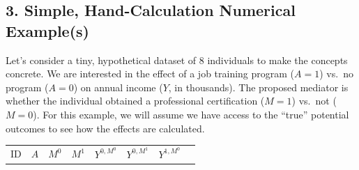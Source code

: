 \documentclass[
  10pt,
  letterpaper,
  DIV=11,
  numbers=noendperiod,
  oneside]{scrartcl}
\begin{document}
\subsection{3. Simple, Hand-Calculation Numerical
Example(s)}\label{simple-hand-calculation-numerical-examples}

Let's consider a tiny, hypothetical dataset of 8 individuals to make the
concepts concrete. We are interested in the effect of a job training
program (\(A=1\)) vs.~no program (\(A=0\)) on annual income (\(Y\), in
thousands). The proposed mediator is whether the individual obtained a
professional certification (\(M=1\)) vs.~not (\(M=0\)). For this
example, we will assume we have access to the ``true'' potential
outcomes to see how the effects are calculated.

\begin{longtable}[]{@{}
  >{\centering\arraybackslash}p{}
  >{\centering\arraybackslash}p{}
  >{\centering\arraybackslash}p{}
  >{\centering\arraybackslash}p{}
  >{\centering\arraybackslash}p{}
  >{\centering\arraybackslash}p{}
  >{\centering\arraybackslash}p{}
  >{\centering\arraybackslash}p{}@{}}
\toprule\noalign{}
\begin{minipage}[b]{\linewidth}\centering
ID
\end{minipage} & \begin{minipage}[b]{\linewidth}\centering
\(A\)
\end{minipage} & \begin{minipage}[b]{\linewidth}\centering
\(M^0\)
\end{minipage} & \begin{minipage}[b]{\linewidth}\centering
\(M^1\)
\end{minipage} & \begin{minipage}[b]{\linewidth}\centering
\(Y^{0, M^0}\)
\end{minipage} & \begin{minipage}[b]{\linewidth}\centering
\(Y^{0, M^1}\)
\end{minipage} & \begin{minipage}[b]{\linewidth}\centering
\(Y^{1, M^0}\)
\end{minipage} & \begin{minipage}[b]{\linewidth}\centering

\end{minipage}
\end{longtable}
\end{document}
